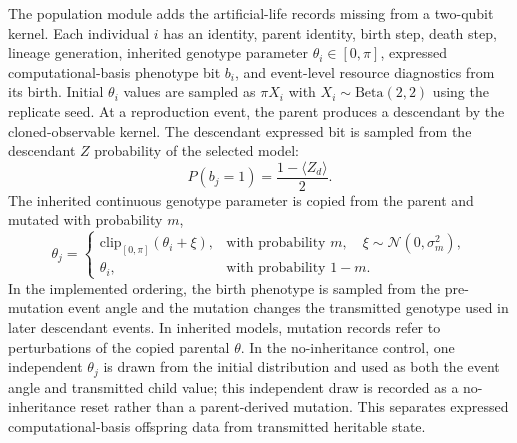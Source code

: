 \documentclass[11pt]{article}
\begin{document}
The population module adds the artificial-life records missing from a two-qubit kernel. Each individual $i$ has an identity, parent identity, birth step, death step, lineage generation, inherited genotype parameter $\theta_i\in[0,\pi]$, expressed computational-basis phenotype bit $b_i$, and event-level resource diagnostics from its birth. Initial $\theta_i$ values are sampled as $\pi X_i$ with $X_i\sim\mathrm{Beta}(2,2)$ using the replicate seed. At a reproduction event, the parent produces a descendant by the cloned-observable kernel. The descendant expressed bit is sampled from the descendant $Z$ probability of the selected model:
\begin{equation}
P(b_j=1)=\frac{1-\langle Z_d\rangle}{2}.
\end{equation}
The inherited continuous genotype parameter is copied from the parent and mutated with probability $m$,
\begin{equation}
\theta_j=
\begin{cases}
\mathrm{clip}_{[0,\pi]}(\theta_i+\xi), & \text{with probability }m,\quad \xi\sim \mathcal{N}(0,\sigma_m^2),\\
\theta_i, & \text{with probability }1-m.
\end{cases}
\end{equation}
In the implemented ordering, the birth phenotype is sampled from the pre-mutation event angle and the mutation changes the transmitted genotype used in later descendant events. In inherited models, mutation records refer to perturbations of the copied parental $\theta$. In the no-inheritance control, one independent $\theta_j$ is drawn from the initial distribution and used as both the event angle and transmitted child value; this independent draw is recorded as a no-inheritance reset rather than a parent-derived mutation. This separates expressed computational-basis offspring data from transmitted heritable state.
\end{document}

